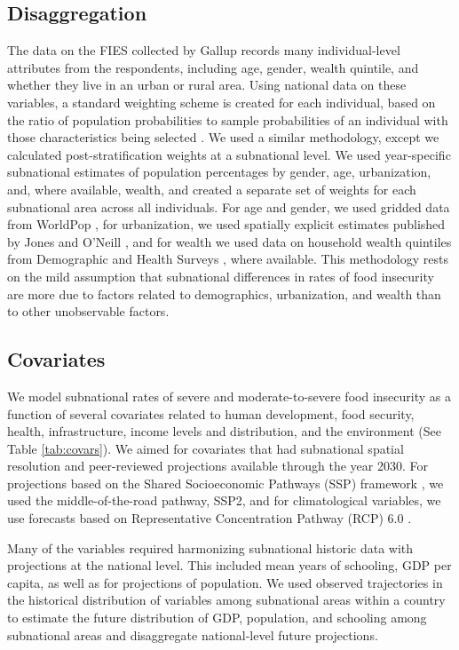 \documentclass{article}
\begin{document}
\subsection{Disaggregation}
The data on the FIES collected by Gallup records many individual-level attributes from the respondents, including age, gender, wealth quintile, and whether they live in an urban or rural area.  Using national data on these variables, a standard weighting scheme is created for each individual, based on the ratio of population probabilities to sample probabilities of an individual with those characteristics being selected \citep{bethlehem2009applied}.  We used a similar methodology, except we calculated post-stratification weights at a subnational level.  We used year-specific subnational estimates of population percentages by gender, age, urbanization, and, where available, wealth, and created a separate set of weights for each subnational area across all individuals.  For age and gender, we used gridded data from WorldPop \citep{Tatem2017}, for urbanization, we used spatially explicit estimates published by Jones and O'Neill \citep{Jones2016}, and for wealth we used data on household wealth quintiles from Demographic and Health Surveys \citep{dhsall}, where available.  This methodology rests on the mild assumption that subnational differences in rates of food insecurity are more due to factors related to demographics, urbanization, and wealth than to other unobservable factors.

\subsection{Covariates}
We model subnational rates of severe and moderate-to-severe food insecurity as a function of several covariates related to human development, food security, health, infrastructure, income levels and distribution, and the environment (See Table \ref{tab:covars}).  We aimed for covariates that had subnational spatial resolution and peer-reviewed projections available through the year 2030.   For projections based on the Shared Socioeconomic Pathways (SSP) framework \citep{oneill2014new}, we used the middle-of-the-road pathway, SSP2, and for climatological variables, we use forecasts based on Representative Concentration Pathway (RCP) 6.0 \citep{van2011representative}.  

Many of the variables required harmonizing subnational historic data with projections at the national level.  This included mean years of schooling, GDP per capita, as well as for projections of population. We used observed trajectories in the historical distribution of variables among subnational areas within a country to estimate the future distribution of GDP, population, and schooling among subnational areas and disaggregate national-level future projections.
\end{document}
